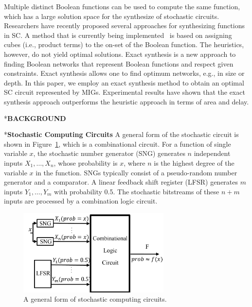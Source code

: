 \documentclass[conference,letterpaper]{IEEEtran}
\makeatletter
\renewcommand{\section}{\@startsection{section}{1}{0mm}
    {-\baselineskip}{0.001\baselineskip}{\bf\leftline}}
\renewcommand{\subsection}{\@startsection{subsection}{1}{0mm}
	{-\baselineskip}{0.001\baselineskip}{\bf\leftline}}
\makeatother
\begin{document}
Multiple distinct Boolean functions can be used to compute the same function, which has a large solution space for the synthesize of stochastic circuits. 
Researchers have recently proposed several approaches for synthesizing functions in SC. 
A method that is currently being implemented~\cite{Cube-Assignment} is based on assigning cubes (i.e., product terms) to the on-set of the Boolean function. The heuristics, however, do not yield optimal solutions. Exact synthesis is a new approach to finding Boolean networks that represent Boolean functions and respect given constraints. Exact synthesis allows one to find optimum networks, e.g., in size or depth. In this paper, we employ an exact synthesis method to obtain an optimal SC circuit represented by MIGs. Experimental results have shown that the exact synthesis approach outperforms the heuristic approach in terms of area and delay.

\section*{\textbf{\large BACKGROUND}}
\subsection*{\textbf{Stochastic Computing Circuits }}
A general form of the stochastic circuit is shown in Figure~\ref{fig2}, which is a combinational circuit. For a function of single variable $x$, the stochastic number generator (SNG) generates $n$ independent inputs $X_{1}, \ldots, X_{n}$, whose probability is $x$, where $n$ is the highest degree of the variable $x$ in the function. SNGs typically consist of a pseudo-random number generator and a comparator. A linear feedback shift register (LFSR) generates $m$ inputs $Y_1, \ldots, Y_m$ with probability 0.5. The stochastic bitstreams of these $n+m$ inputs are processed by a combination logic circuit.

\begin{figure}[t]
	\centering
	\includegraphics[width=3in]{fig/sc.pdf}	
	\caption{\label{fig2}A general form of stochastic computing circuits.} \vspace{-2ex}
\end{figure}
\end{document}
